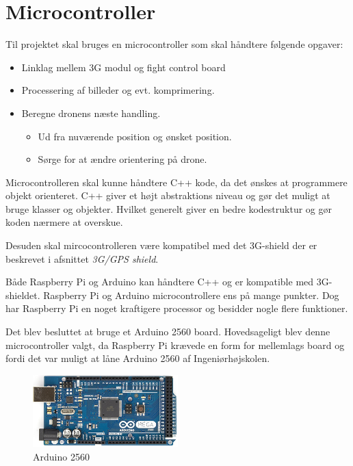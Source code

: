 \section{Microcontroller}

Til projektet skal bruges en microcontroller som skal håndtere følgende opgaver:  
\begin{itemize}
	\item Linklag mellem 3G modul og fight control board
	\item Processering af billeder og evt. komprimering.
	\item Beregne dronens næste handling. 
	\begin{itemize}
		\item Ud fra nuværende position og ønsket position.
		\item Sørge for at ændre orientering på drone. 
	\end{itemize}
\end{itemize}

\vspace{0.5cm}

Microcontrolleren skal kunne håndtere C++ kode, da det ønskes at programmere objekt orienteret. C++ giver et højt abstraktions niveau og gør det muligt at bruge klasser og objekter. Hvilket generelt giver en bedre kodestruktur og gør koden nærmere at overskue.

Desuden skal mircocontrolleren være kompatibel med det 3G-shield der er beskrevet i afsnittet \textit{3G/GPS shield}. 

Både Raspberry Pi og Arduino kan håndtere C++ og er kompatible med 3G-shieldet. Raspberry Pi og Arduino microcontrollere ens på mange punkter. Dog har Raspberry Pi en noget kraftigere processor og besidder nogle flere funktioner. 

Det blev besluttet at bruge et Arduino 2560 board. Hovedsageligt blev denne microcontroller valgt, da Raspberry Pi krævede en form for mellemlags board og fordi det var muligt at låne Arduino 2560 af Ingeniørhøjskolen. 

\vspace{0.5cm}

\begin{figure}[H]
\centering
\includegraphics[width=0.5\textwidth]{Billeder/ArduinoMega2560.png}
\caption[Arduino 2560]{Arduino 2560\protect\footnotemark}
\label{fig:Arduino_2560}
\end{figure}

